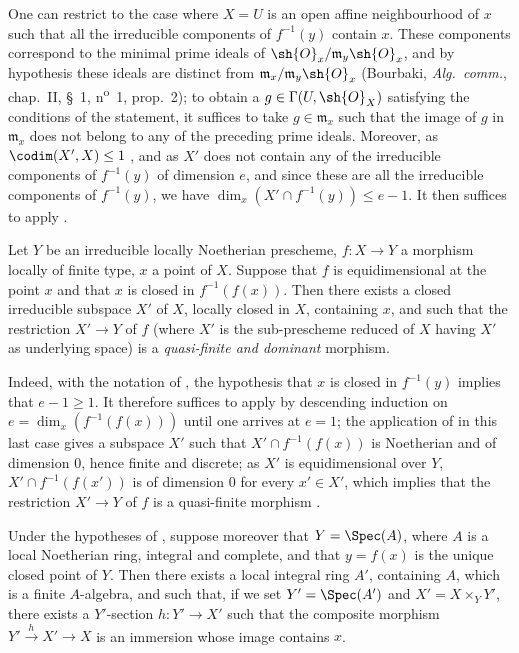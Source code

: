 One can restrict to the case where $X=U$ is an open affine neighbourhood of $x$ such that all the irreducible components of $f^{-1}(y)$ contain $x$.
These components correspond to the minimal prime ideals of $\sh{O}_x/\mathfrak{m}_y\sh{O}_x$, and by hypothesis these ideals are distinct from $\mathfrak{m}_x/\mathfrak{m}_y\sh{O}_x$ (Bourbaki, \emph{Alg.\ comm.}, chap.~II, \S~1, n\textsuperscript{o}~1, prop.~2); to obtain a $g\in\Gamma(U,\sh{O}_X)$ satisfying the conditions of the statement, it suffices to take $g\in\mathfrak{m}_x$ such that the image of $g$ in $\mathfrak{m}_x$ does not belong to any of the preceding prime ideals.
Moreover, as $\codim(X',X)\leq 1$ , and as $X'$ does not contain any of the irreducible components of $f^{-1}(y)$ of dimension $e$, and since these are all the irreducible components of $f^{-1}(y)$, we have  $\dim_x(X'\cap f^{-1}(y))\leq e-1$.
It then suffices to apply .

\begin{proposition}[14.5.3]
\label{IV.14.5.3}
Let $Y$ be an irreducible locally Noetherian prescheme, $f:X\to Y$ a morphism locally of finite type, $x$ a point of $X$.
Suppose that $f$ is equidimensional at the point $x$ and that $x$ is closed in $f^{-1}(f(x))$.
Then there exists a closed irreducible subspace $X'$ of $X$, locally closed in $X$, containing $x$, and such that the restriction $X'\to Y$ of $f$ (where $X'$ is the sub-prescheme reduced of $X$ having $X'$ as underlying space) is a \emph{quasi-finite and dominant} morphism.
\end{proposition}

Indeed, with the notation of , the hypothesis that $x$ is closed in $f^{-1}(y)$ implies that $e-1\geq 1$.
It therefore suffices to apply  by descending induction on $e=\dim_x(f^{-1}(f(x)))$ until one arrives at $e=1$; the application of  in this last case gives a subspace $X'$ such that $X'\cap f^{-1}(f(x))$ is Noetherian and of dimension $0$, hence finite and discrete; as $X'$ is equidimensional over $Y$, $X'\cap f^{-1}(f(x'))$ is of dimension $0$ for every $x'\in X'$, which implies that the restriction $X'\to Y$ of $f$ is a quasi-finite morphism .

\begin{corollary}[14.5.4]
\label{IV.14.5.4}
Under the hypotheses of , suppose moreover that $Y=\Spec(A)$, where $A$ is a local Noetherian ring, integral and complete, and that $y=f(x)$ is the unique closed point of $Y$.
Then there exists a local integral ring $A'$, containing $A$, which is a finite $A$-algebra, and such that, if we set $Y'=\Spec(A')$ and $X'=X\times_Y Y'$, there exists a $Y'$-section $h:Y'\to X'$ such that the composite morphism $Y'\xrightarrow{h}X'\to X$ is an immersion whose image contains $x$.
\end{corollary}


